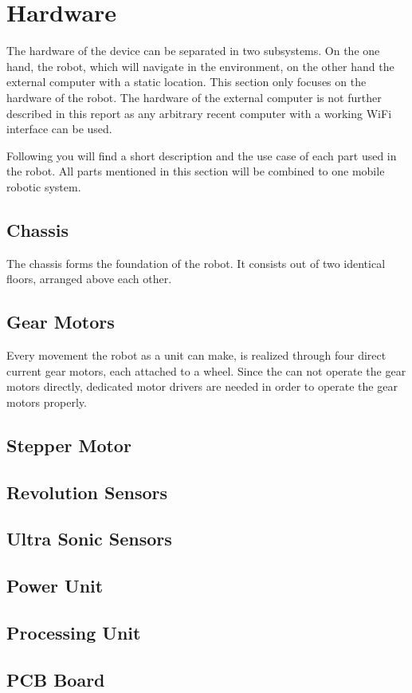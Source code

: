 \newpage

\section{Hardware}

The hardware of the device can be separated in two subsystems. On the one hand, the robot, which will navigate in the environment, on the other hand the external computer with a static location. This section only focuses on the hardware of the robot. The hardware of the external computer is not further described in this report as any arbitrary recent computer with a working WiFi interface can be used.

Following you will find a short description and the use case of each part used in the robot. All parts mentioned in this section will be combined to one mobile robotic system.

\subsection{Chassis}\label{subsec:chassis}

The chassis forms the foundation of the robot. It consists out of two identical floors, arranged above each other. 

\subsection{Gear Motors}\label{subsec:gear_motors}

Every movement the robot as a unit can make, is realized through four direct current gear motors, each attached to a wheel. Since the  can not operate the gear motors directly, dedicated motor drivers are needed in order to operate the gear motors properly. 

\subsection{Stepper Motor}\label{subsec:stepper_motor}

\subsection{Revolution Sensors}\label{subsec:revolution_sensor}

\subsection{Ultra Sonic Sensors}\label{subsec:ultra_sonic_sensor}

\subsection{Power Unit}\label{subsec:power_unit}

\subsection{Processing Unit}\label{subsec:processing_unit}

\subsection{PCB Board}\label{subsec:pcb_board}


